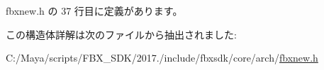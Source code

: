  fbxnew.\+h の 37 行目に定義があります。



この構造体詳解は次のファイルから抽出されました\+:\begin{DoxyCompactItemize}
\item 
C\+:/\+Maya/scripts/\+F\+B\+X\+\_\+\+S\+D\+K/2017./include/fbxsdk/core/arch/\hyperlink{fbxnew_8h}{fbxnew.\+h}\end{DoxyCompactItemize}
